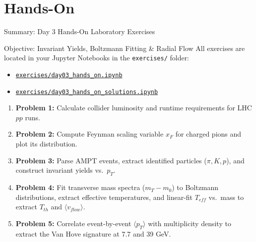 \documentclass[aspectratio=169]{beamer}
\begin{document}
\section{Hands-On}

\begin{frame}{Summary: Day 3 Hands-On Laboratory Exercises}
    \begin{block}{Objective: Invariant Yields, Boltzmann Fitting \& Radial Flow}
        \small
        All exercises are located in your Jupyter Notebooks in the \texttt{exercises/} folder:
        \begin{itemize}
            \item \href{run:exercises/day03_hands_on.ipynb}{\texttt{exercises/day03\_hands\_on.ipynb}} 
            \item \href{run:exercises/day03_hands_on_solutions.ipynb}{\texttt{exercises/day03\_hands\_on\_solutions.ipynb}} 
        \end{itemize}
    \end{block}
    \begin{enumerate}
        \footnotesize
        \item \textbf{Problem 1:} Calculate collider luminosity and runtime requirements for LHC $pp$ runs.
        \item \textbf{Problem 2:} Compute Feynman scaling variable $x_F$ for charged pions and plot its distribution.
        \item \textbf{Problem 3:} Parse AMPT events, extract identified particles ($\pi, K, p$), and construct invariant yields vs.\ $p_T$.
        \item \textbf{Problem 4:} Fit transverse mass spectra ($m_T - m_0$) to Boltzmann distributions, extract effective temperatures, and linear-fit $T_{eff}$ vs.\ mass to extract $T_{th}$ and $\langle v_{flow} \rangle$.
        \item \textbf{Problem 5:} Correlate event-by-event $\langle p_T \rangle$ with multiplicity density to extract the Van Hove signature at 7.7 and 39 GeV.
    \end{enumerate}
\end{frame}
\end{document}
